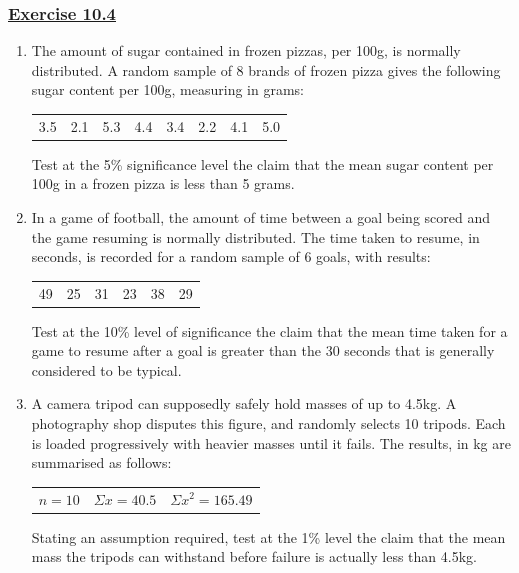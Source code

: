 \documentclass[
  11pt,
]{book}
\begin{document}
\subsubsection*{\texorpdfstring{\hyperref[ex104a]{Exercise 10.4}}{Exercise 10.4}}\label{exercise-10.4}

\begin{enumerate}
    \item The amount of sugar contained in frozen pizzas, per 100g, is normally distributed. A random sample of 8 brands of frozen pizza gives the following sugar content per 100g, measuring in grams:
    \begin{center}
    \begin{tabular}{c c c c c c c c} 
      3.5 & 2.1 & 5.3 & 4.4 & 3.4 & 2.2 & 4.1 & 5.0\\ 
    \end{tabular}
    \end{center}
    Test at the 5\% significance level the claim that the mean sugar content per 100g in a frozen pizza is less than 5 grams.
    \item In a game of football, the amount of time between a goal being scored and the game resuming is normally distributed. The time taken to resume, in seconds, is recorded for a random sample of 6 goals, with results:
    \begin{center}
    \begin{tabular}{c c c c c c} 
      49 & 25 & 31 & 23 & 38 & 29\\ 
    \end{tabular}
    \end{center}
    Test at the 10\% level of significance the claim that the mean time taken for a game to resume after a goal is greater than the 30 seconds that is generally considered to be typical.
    \item A camera tripod can supposedly safely hold masses of up to 4.5kg. A photography shop disputes this figure, and randomly selects 10 tripods. Each is loaded progressively with heavier masses until it fails. The results, in kg are summarised as follows:
    \begin{center}
    \begin{tabular}{c c c} 
      $n=\text{10}$ & $\Sigma x=\text{40.5}$ & $\Sigma x^\text{2}=\text{165.49}$\\ 
    \end{tabular}
    \end{center}
    Stating an assumption required, test at the 1\% level the claim that the mean mass the tripods can withstand before failure is actually less than 4.5kg.

\end{enumerate}
\end{document}
